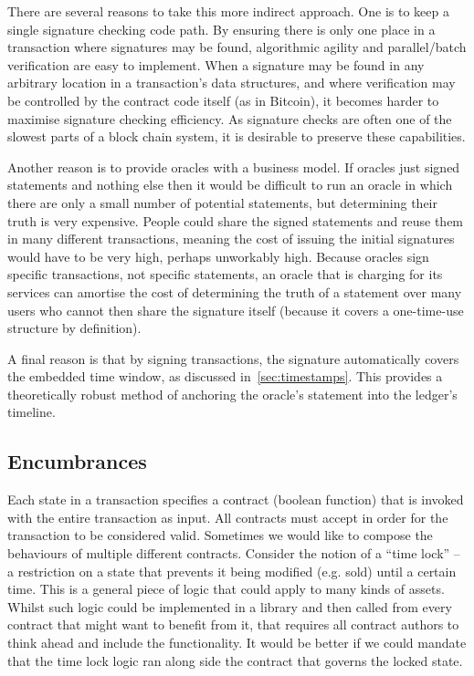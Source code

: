 \documentclass{article}
\begin{document}
There are several reasons to take this more indirect approach. One is to keep a single signature checking code
path. By ensuring there is only one place in a transaction where signatures may be found, algorithmic agility and
parallel/batch verification are easy to implement. When a signature may be found in any arbitrary location in a
transaction's data structures, and where verification may be controlled by the contract code itself (as in
Bitcoin), it becomes harder to maximise signature checking efficiency. As signature checks are often one of the
slowest parts of a block chain system, it is desirable to preserve these capabilities.

Another reason is to provide oracles with a business model. If oracles just signed statements and nothing else then
it would be difficult to run an oracle in which there are only a small number of potential statements, but
determining their truth is very expensive. People could share the signed statements and reuse them in many
different transactions, meaning the cost of issuing the initial signatures would have to be very high, perhaps
unworkably high. Because oracles sign specific transactions, not specific statements, an oracle that is charging
for its services can amortise the cost of determining the truth of a statement over many users who cannot then
share the signature itself (because it covers a one-time-use structure by definition).

A final reason is that by signing transactions, the signature automatically covers the embedded time window, as
discussed in~\cref{sec:timestamps}. This provides a theoretically robust method of anchoring the oracle's statement
into the ledger's timeline.

\subsection{Encumbrances}\label{sec:encumbrances}

Each state in a transaction specifies a contract (boolean function) that is invoked with the entire transaction as
input. All contracts must accept in order for the transaction to be considered valid. Sometimes we would like to
compose the behaviours of multiple different contracts. Consider the notion of a ``time lock'' -- a restriction on
a state that prevents it being modified (e.g. sold) until a certain time. This is a general piece of logic that
could apply to many kinds of assets. Whilst such logic could be implemented in a library and then called from every
contract that might want to benefit from it, that requires all contract authors to think ahead and include the
functionality. It would be better if we could mandate that the time lock logic ran along side the contract that
governs the locked state.
\end{document}
